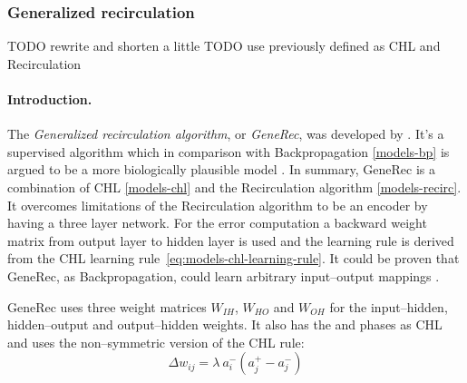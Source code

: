 \subsubsection{Generalized recirculation}
\label{models-generec} 

TODO rewrite and shorten a little 
TODO use previously defined as CHL and Recirculation

\paragraph{Introduction.} 

The \emph{Generalized recirculation algorithm}, or \emph{GeneRec}, was developed by \citet{o1996bio}. It's a supervised algorithm which in comparison with Backpropagation \ref{models-bp} is argued to be a more biologically plausible model \citep{o1998six, o2001generalization, da2011advances, schneider2009application}. In summary, GeneRec is a combination of CHL \ref{models-chl} and the Recirculation algorithm \ref{models-recirc}. It overcomes limitations of the Recirculation algorithm to be an encoder by having a three layer network. For the error computation a backward weight matrix from output layer to hidden layer is used and the learning rule is derived from the CHL learning rule~\ref{eq:models-chl-learning-rule}. It could be proven that GeneRec, as Backpropagation, could learn arbitrary input--output mappings \citep{o1996bio}. 

GeneRec uses three weight matrices $W_{IH}$, $W_{HO}$ and $W_{OH}$ for the input--hidden, hidden--output and output--hidden weights. It also has the \quotes{-} and \quotes{+} phases as CHL and uses the non--symmetric version of the CHL rule: 
\begin{equation}
  \label{eq:models-generec-learning-rule}
  \Delta w_{ij} = \lambda \ a^{-}_i(a^{+}_j - a^{-}_j)
\end{equation}

